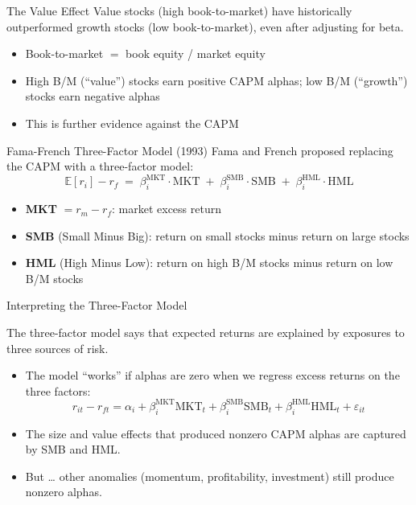 \documentclass[aspectratio=169,t]{beamer}
\begin{document}
\begin{frame}{The Value Effect}
\alert{Value stocks (high book-to-market) have historically outperformed growth stocks (low book-to-market)}, even after adjusting for beta.

\begin{itemize}
\item Book-to-market $=$ book equity / market equity
\item High B/M (``value'') stocks earn positive CAPM alphas; low B/M (``growth'') stocks earn negative alphas
\item This is further evidence against the CAPM
\end{itemize}
\end{frame}

\begin{frame}{Fama-French Three-Factor Model (1993)}
Fama and French proposed replacing the CAPM with a three-factor model:
\[
\mathbb{E}[r_i] - r_f \;=\; \beta_i^{\text{MKT}} \cdot \text{MKT} \;+\; \beta_i^{\text{SMB}} \cdot \text{SMB} \;+\; \beta_i^{\text{HML}} \cdot \text{HML}
\]

\begin{itemize}
\item \textbf{MKT} $= r_m - r_f$: market excess return
\item \textbf{SMB} (Small Minus Big): return on small stocks minus return on large stocks
\item \textbf{HML} (High Minus Low): return on high B/M stocks minus return on low B/M stocks
\end{itemize}
\end{frame}

\begin{frame}{Interpreting the Three-Factor Model}

The three-factor model says that expected returns are explained by exposures to three sources of risk.

\begin{itemize}
\item The model ``works'' if alphas are zero when we regress excess returns on the three factors:
\[
r_{it} - r_{ft} = \alpha_i + \beta_i^{\text{MKT}} \text{MKT}_t + \beta_i^{\text{SMB}} \text{SMB}_t + \beta_i^{\text{HML}} \text{HML}_t + \varepsilon_{it}
\]
\item The size and value effects that produced nonzero CAPM alphas are captured by SMB and HML.
\item But \ldots{} other anomalies (momentum, profitability, investment) still produce nonzero alphas.
\end{itemize}
\end{frame}
\end{document}
